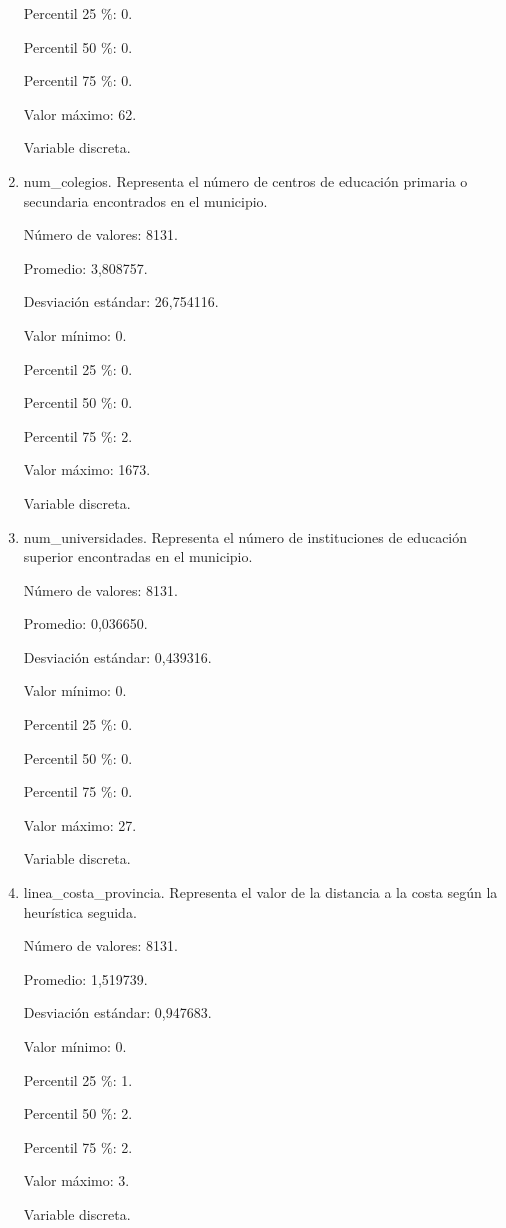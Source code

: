 \begin{enumerate}
	Percentil 25 \%: 0.
	
	Percentil 50 \%: 0.
	
	Percentil 75 \%: 0.
	
	Valor máximo: 62.
	
	Variable discreta.

	\item num\_colegios. Representa el número de centros de educación primaria o secundaria encontrados en el municipio.
	
	Número de valores: 8131.
	
	Promedio: 3,808757.
	
	Desviación estándar: 26,754116.
	
	Valor mínimo: 0.
	
	Percentil 25 \%: 0.
	
	Percentil 50 \%: 0.
	
	Percentil 75 \%: 2.
	
	Valor máximo: 1673.
	
	Variable discreta.

	\item num\_universidades. Representa el número de instituciones de educación superior encontradas en el municipio.
	
	Número de valores: 8131.
	
	Promedio: 0,036650.
	
	Desviación estándar: 0,439316.
	
	Valor mínimo: 0.
	
	Percentil 25 \%: 0.
	
	Percentil 50 \%: 0.
	
	Percentil 75 \%: 0.
	
	Valor máximo: 27.
	
	Variable discreta.

	\item linea\_costa\_provincia. Representa el valor de la distancia a la costa según la heurística seguida.
	
	Número de valores: 8131.
	
	Promedio: 1,519739.
	
	Desviación estándar: 0,947683.
	
	Valor mínimo: 0.
	
	Percentil 25 \%: 1.
	
	Percentil 50 \%: 2.
	
	Percentil 75 \%: 2.
	
	Valor máximo: 3.
	
	Variable discreta.


\end{enumerate}
